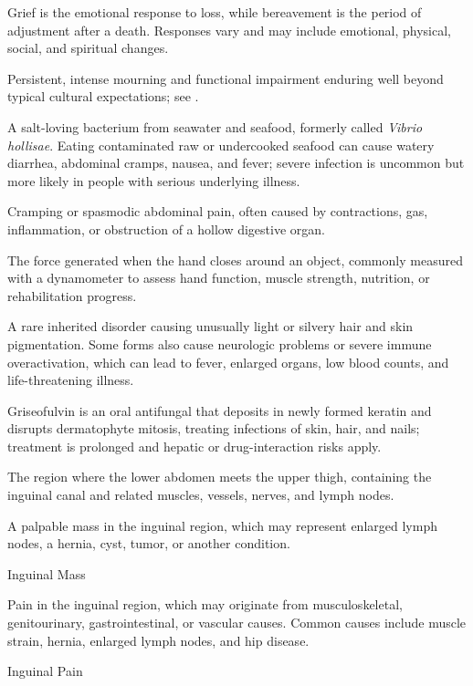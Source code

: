  Grief is the emotional response to loss, while bereavement is the period of adjustment after a death. Responses vary and may include emotional, physical, social, and spiritual changes.

 Persistent, intense mourning and functional impairment enduring well beyond typical cultural expectations; see .

 A salt-loving bacterium from seawater and seafood, formerly called \textit{Vibrio hollisae}. Eating contaminated raw or undercooked seafood can cause watery diarrhea, abdominal cramps, nausea, and fever; severe infection is uncommon but more likely in people with serious underlying illness.

 Cramping or spasmodic abdominal pain, often caused by contractions, gas, inflammation, or obstruction of a hollow digestive organ.

 The force generated when the hand closes around an object, commonly measured with a dynamometer to assess hand function, muscle strength, nutrition, or rehabilitation progress.

 A rare inherited disorder causing unusually light or silvery hair and skin pigmentation. Some forms also cause neurologic problems or severe immune overactivation, which can lead to fever, enlarged organs, low blood counts, and life-threatening illness.

 Griseofulvin is an oral antifungal that deposits in newly formed keratin and disrupts dermatophyte mitosis, treating infections of skin, hair, and nails; treatment is prolonged and hepatic or drug-interaction risks apply.

 The region where the lower abdomen meets the upper thigh, containing the inguinal canal and related muscles, vessels, nerves, and lymph nodes.

 A palpable mass in the inguinal region, which may represent enlarged lymph nodes, a hernia, cyst, tumor, or another condition.

\synonyms
Inguinal Mass

 Pain in the inguinal region, which may originate from musculoskeletal, genitourinary, gastrointestinal, or vascular causes. Common causes include muscle strain, hernia, enlarged lymph nodes, and hip disease.

\synonyms
Inguinal Pain

